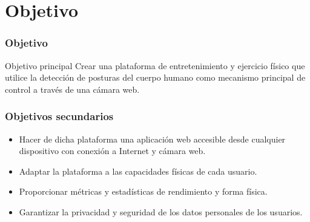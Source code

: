 \section{Objetivo}


\begin{frame}
    \frametitle{Objetivo}
    \begin{block}{Objetivo principal}
        Crear una \alert{plataforma de entretenimiento y ejercicio físico} que
        utilice la \alert{detección de posturas} del cuerpo humano como
        mecanismo principal de control a través de una cámara web.
    \end{block}
\end{frame}

\begin{frame}
    \frametitle{Objetivos secundarios}

    \begin{itemize}
        \item Hacer de dicha plataforma una \alert{aplicación web accesible}
        desde cualquier dispositivo con conexión a Internet y cámara web.
        \pause

        \item \alert{Adaptar} la plataforma a las capacidades físicas de cada
        usuario.
        \pause

        \item Proporcionar \alert{métricas y estadísticas} de rendimiento y
        forma física.
        \pause

        \item Garantizar la \alert{privacidad y seguridad} de los datos
        personales de los usuarios.

    \end{itemize}
\end{frame}
